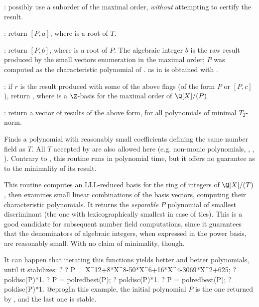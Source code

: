 \item {}: possibly use a suborder of the maximal order,
\emph{without} attempting to certify the result.

\item {}: return $[P, a]$, where  is a root of $T$.

\item {}: return $[P, b]$, where  is a root of $P$.
The algebraic integer $b$ is the raw result produced by the small vectors
enumeration in the maximal order; $P$ was computed as the characteristic
polynomial of .  as in 
is obtained with .

\item {}: if $r$ is the result produced with some of the above
flags (of the form $P$ or $[P,c]$), return \kbd{[r,zk]}, where  is a
$\Z$-basis for the maximal order of $\Q[X]/(P)$.

\item {}: return a vector of results of the above form, for all
polynomials of minimal $T_2$-norm.

\label{se:polredbest}
Finds a polynomial with reasonably
small coefficients defining the same number field as $T$.
All $T$ accepted by  are also allowed here (e.g. non-monic
polynomials, , , \kbd{[T,Z\_K\_basis]}). Contrary to
, this routine runs in polynomial time, but it offers no
guarantee as to the minimality of its result.

This routine computes an LLL-reduced basis for the ring of integers of
$\Q[X]/(T)$, then examines small linear combinations of the basis vectors,
computing their characteristic polynomials. It returns the \emph{separable}
$P$ polynomial of smallest discriminant (the one with lexicographically
smallest  in case of ties). This is a good candidate
for subsequent number field computations, since it guarantees that
the denominators of algebraic integers, when expressed in the power basis,
are reasonably small. With no claim of minimality, though.

It can happen that iterating this functions yields better and better
polynomials, until it stabilizes:
\bprog
? 
? P = X^12+8*X^8-50*X^6+16*X^4-3069*X^2+625;
? poldisc(P)*1.
? P = polredbest(P);
? poldisc(P)*1.
? P = polredbest(P);
? poldisc(P)*1.
@eprog\noindent In this example, the initial polynomial $P$ is the one
returned by , and the last one is stable.

